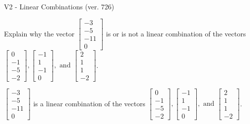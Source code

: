 \begin{exercise}
  \begin{exerciseTitle}V2 - Linear Combinations (ver. 726)\end{exerciseTitle}
  \begin{exerciseStatement}
    Explain why the vector \(\left[\begin{array}{c}
-3 \\
-5 \\
-11 \\
0
\end{array}\right]\)  is or is not a linear 
	combination of the vectors \(\left[\begin{array}{c}
0 \\
-1 \\
-5 \\
-2
\end{array}\right] , \left[\begin{array}{c}
-1 \\
1 \\
-1 \\
0
\end{array}\right] , \text{ and } \left[\begin{array}{c}
2 \\
1 \\
1 \\
-2
\end{array}\right]\).
	


  \end{exerciseStatement}
  \begin{exerciseAnswer}
   \(\left[\begin{array}{c}
-3 \\
-5 \\
-11 \\
0
\end{array}\right]\) 
  	 is  
	a linear combination of the vectors \(\left[\begin{array}{c}
0 \\
-1 \\
-5 \\
-2
\end{array}\right] , \left[\begin{array}{c}
-1 \\
1 \\
-1 \\
0
\end{array}\right] , \text{ and } \left[\begin{array}{c}
2 \\
1 \\
1 \\
-2
\end{array}\right]\).

	
  


  \end{exerciseAnswer}
\end{exercise}